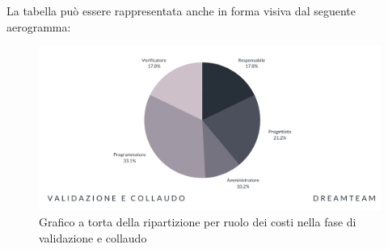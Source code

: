 La tabella può essere rappresentata anche in forma visiva dal seguente aerogramma:
\begin{figure}[!h]
\centering
\includegraphics[scale=0.65]{Sezioni/SezioniPreventivo/grafici/Validazione_costi.png}
\caption{Grafico a torta della ripartizione per ruolo dei costi nella fase di validazione e collaudo}
\end{figure}
